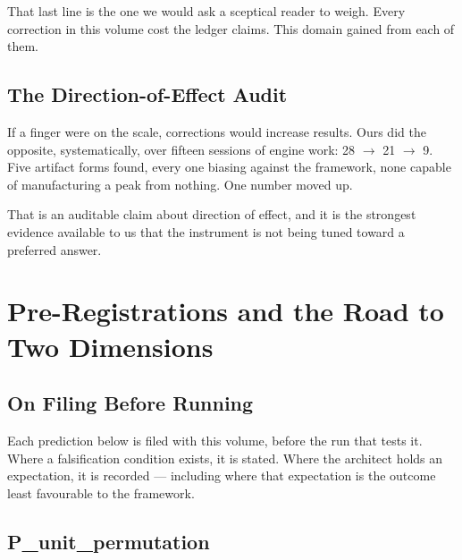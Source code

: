 \documentclass[11pt, letterpaper, openany]{book}
\begin{document}
That last line is the one we would ask a sceptical reader to weigh. Every correction in this
volume cost the ledger claims. This domain gained from each of them.

\section{The Direction-of-Effect Audit}

If a finger were on the scale, corrections would increase results. Ours did the opposite,
systematically, over fifteen sessions of engine work: 28 $\to$ 21 $\to$ 9. Five artifact forms
found, every one biasing against the framework, none capable of manufacturing a peak from
nothing. One number moved up.

That is an auditable claim about direction of effect, and it is the strongest evidence available
to us that the instrument is not being tuned toward a preferred answer.

\chapter{Pre-Registrations and the Road to Two Dimensions}

\section{On Filing Before Running}

Each prediction below is filed with this volume, before the run that tests it. Where a
falsification condition exists, it is stated. Where the architect holds an expectation, it is
recorded --- including where that expectation is the outcome least favourable to the framework.

\section{P\_unit\_permutation}
\end{document}
